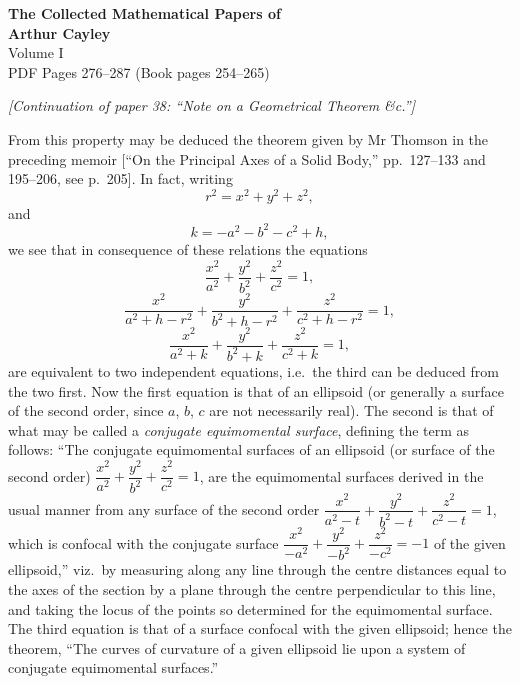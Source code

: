 \documentclass[11pt]{article}
\begin{document}
\begin{center}
{\LARGE\bfseries The Collected Mathematical Papers of}\\[0.5em]
{\LARGE\bfseries Arthur Cayley}\\[1em]
{\Large Volume I}\\[1em]
{\large PDF Pages 276--287 \quad (Book pages 254--265)}\\[2em]
\end{center}

\tableofcontents
\newpage

\setcounter{page}{254}

\noindent\textit{[Continuation of paper 38: ``Note on a Geometrical Theorem \&c.'']}

\bigskip

From this property may be deduced the theorem given by Mr Thomson in the preceding memoir [``On the Principal Axes of a Solid Body,'' pp.~127--133 and 195--206, see p.~205]. In fact, writing
\[
r^2 = x^2 + y^2 + z^2,
\]
and
\[
k = -a^2 - b^2 - c^2 + h,
\]
we see that in consequence of these relations the equations
\[
\frac{x^2}{a^2} + \frac{y^2}{b^2} + \frac{z^2}{c^2} = 1,
\]
\[
\frac{x^2}{a^2 + h - r^2} + \frac{y^2}{b^2 + h - r^2} + \frac{z^2}{c^2 + h - r^2} = 1,
\]
\[
\frac{x^2}{a^2 + k} + \frac{y^2}{b^2 + k} + \frac{z^2}{c^2 + k} = 1,
\]
are equivalent to two independent equations, i.e.\ the third can be deduced from the two first. Now the first equation is that of an ellipsoid (or generally a surface of the second order, since $a$, $b$, $c$ are not necessarily real). The second is that of what may be called a \textit{conjugate equimomental surface}, defining the term as follows: ``The conjugate equimomental surfaces of an ellipsoid (or surface of the second order) $\dfrac{x^2}{a^2}+\dfrac{y^2}{b^2}+\dfrac{z^2}{c^2}=1$, are the equimomental surfaces derived in the usual manner from any surface of the second order $\dfrac{x^2}{a^2-t}+\dfrac{y^2}{b^2-t}+\dfrac{z^2}{c^2-t}=1$, which is confocal with the conjugate surface $\dfrac{x^2}{-a^2}+\dfrac{y^2}{-b^2}+\dfrac{z^2}{-c^2}=-1$ of the given ellipsoid,'' viz.\ by measuring along any line through the centre distances equal to the axes of the section by a plane through the centre perpendicular to this line, and taking the locus of the points so determined for the equimomental surface. The third equation is that of a surface confocal with the given ellipsoid; hence the theorem, ``The curves of curvature of a given ellipsoid lie upon a system of conjugate equimomental surfaces.''
\end{document}
